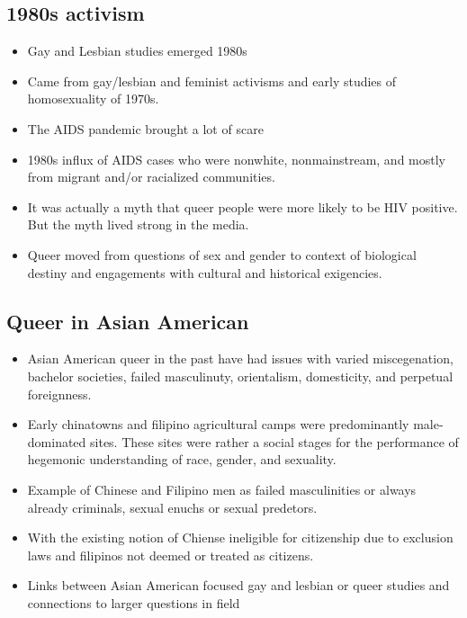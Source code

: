 \documentclass{article}
\begin{document}
  \subsection{1980s activism}
  \begin{itemize}
    \item Gay and Lesbian studies emerged 1980s
    \item Came from gay/lesbian and feminist activisms and
      early studies of homosexuality of 1970s.
    \item The AIDS pandemic brought a lot of scare
    \item 1980s influx of AIDS cases who were nonwhite,
      nonmainstream, and mostly from migrant and/or racialized communities.
    \item It was actually a myth that queer people
      were more likely to be HIV positive.
      But the myth lived strong in the media.
    \item Queer moved from questions of sex and gender
      to context of biological destiny and engagements
      with cultural and historical exigencies.
  \end{itemize}

  \subsection{Queer in Asian American}
  \begin{itemize}
    \item Asian American queer in the past have had issues
      with varied miscegenation, bachelor societies,
      failed masculinuty, orientalism, domesticity,
      and perpetual foreignness.
    \item Early chinatowns and filipino agricultural camps were
      predominantly male-dominated sites. These sites were
      rather a social stages for the performance of hegemonic
      understanding of race, gender, and sexuality.
    \item Example of Chinese and Filipino men as failed masculinities
      or always already criminals, sexual enuchs or sexual predetors.
    \item With the existing notion of Chiense
      ineligible for citizenship due to exclusion laws and filipinos not
      deemed or treated as citizens.
    \item Links between Asian American focused gay and lesbian or queer studies
      and connections to larger questions in field
  \end{itemize}
  
\end{document}
